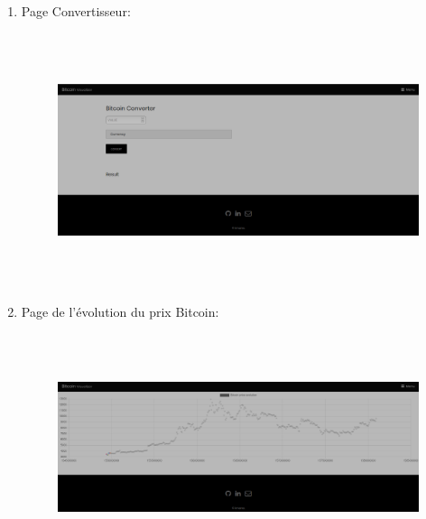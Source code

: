 \documentclass[12pt]{article}
\begin{document}
\begin{enumerate}
\begin{enumerate}
\begin{enumerate}
	\item Page Convertisseur:\par





\begin{figure}[H]
	\begin{Center}
		\includegraphics[width=6.69in,height=2.92in]{./media/image10.png}
	\end{Center}
\end{figure}




\par

	\item Page de l’évolution du prix Bitcoin:\par





\begin{figure}[H]
	\begin{Center}
		\includegraphics[width=6.69in,height=2.62in]{./media/image11.png}
	\end{Center}
\end{figure}





\end{enumerate}
\end{enumerate}
\end{enumerate}
\end{document}
